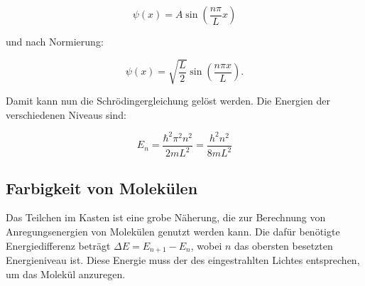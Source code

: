 \begin{equation}
\psi (x) = A \sin \left(\dfrac{n \pi}{L} x\right)
\end{equation}
    
und nach Normierung:

\begin{equation}
\psi(x)=\sqrt{\dfrac{L}{2}}\sin \left(\dfrac{n \pi x}{L}\right). 
\end{equation}


Damit kann nun die Schrödingergleichung gelöst werden. Die Energien der verschiedenen Niveaus sind: 

\begin{equation}
E_n = \frac{\hbar^2 \pi^2 n^2}{2m L^2} = \frac{h^2 n^2}{8m L^2}
\end{equation}



\subsection{Farbigkeit von Molekülen}

Das Teilchen im Kasten ist eine grobe Näherung, die zur Berechnung von Anregungsenergien von Molekülen genutzt werden kann. Die dafür benötigte Energiedifferenz beträgt $ \Delta E = E_{n+1}-E_n $, wobei $ n $ das obersten besetzten Energieniveau ist. Diese Energie muss der des eingestrahlten Lichtes entsprechen, um das Molekül anzuregen.
